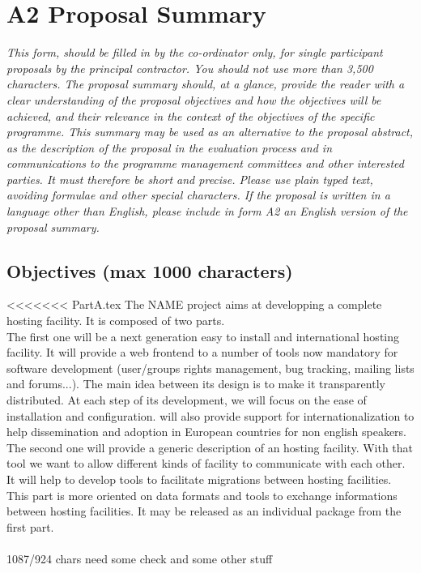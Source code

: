 \documentclass[a4paper,11pt]{report}
\begin{document}
\section*{A2 Proposal Summary}
\textit{This form, should be filled in by the co-ordinator only, for single
participant proposals by the principal contractor. You should not use more than
3,500 characters. The proposal summary should, at a glance, provide the reader
with a clear understanding of the proposal objectives and how the objectives
will be achieved, and their relevance in the context of the objectives of the
specific programme. This summary may be used as an alternative to the proposal
abstract, as the description of the proposal in the evaluation process and in
communications to the programme management committees and other interested
parties. It must therefore be short and precise. Please use plain typed text,
avoiding formulae and other special characters. If the proposal is written in a
language other than English, please include in form A2 an English version of
the proposal summary.} \\
\subsection*{Objectives (max 1000 characters)}
<<<<<<< PartA.tex
The NAME project aims at developping a complete hosting facility. It is 
composed of two parts. \\
The first one will be a next generation easy to install and international
hosting facility. It will provide a web frontend to a number of tools now 
mandatory for software development (user/groups rights management, bug tracking, mailing lists and forums...). 
The main idea between its design is to make it transparently distributed.
At each step of its development, we will focus on the ease of installation and configuration.  will also provide support for internationalization to help dissemination and adoption in European countries for non english speakers.\\
The second one will provide a generic description of
an hosting facility. With that tool we want to allow different kinds of facility
to communicate with each other. It will help to develop tools to facilitate
migrations between hosting facilities. This part is more oriented on data formats and tools to exchange informations between hosting facilities. It may
be released as an individual package from the first part.\\

\\ 1087/924 chars need some check and some other stuff
\end{document}
